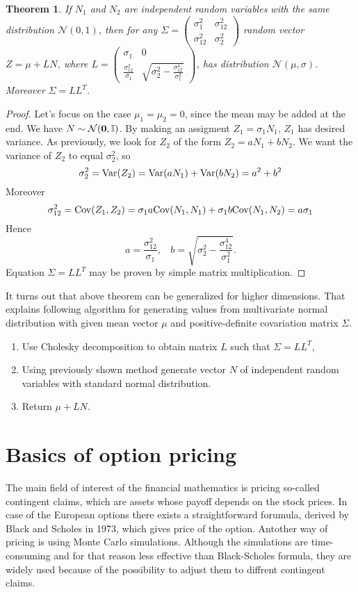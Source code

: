 \documentclass[a4paper,12pt, oneside]{book}
\newtheorem{thm}{Theorem}[chapter]
\theoremstyle{definition}
\theoremstyle{remark}
\def\Var{{\rm Var}}
\def\Cov{{\hbox{Cov}}}
\begin{document}
\begin{thm}
 If $N_1$ and $N_2$ are independent random variables with the same distribution $\mathcal{N}(0,1)$, then for any
 $\Sigma = \left( \begin{array}{cc}
                      \sigma_1^2 & \sigma_{12}^2 \\
                      \sigma_{12}^2 & \sigma_2^2
                   \end{array} \right)$
 random vector $ Z = \mu + LN$, where
  $L = \left( \begin{array}{cc}
                      \sigma_1 & 0 \\
                      \frac{\sigma_{12}^2}{\sigma_1} & \sqrt{\sigma_2^2 - \frac{\sigma_{12}^4}{\sigma_1^2}}
                   \end{array} \right)$,
 has distribution $\mathcal{N}(\mu,\sigma)$. Moreover $\Sigma = LL^T$.
\end{thm}
\begin{proof}
Let's focus on the case $\mu_1 = \mu_2 = 0$, since the mean may be added at the end. We have $N \sim \mathcal{N}(\bf{0}, \mathbb{I})$. By making an assigment $Z_1 = \sigma_1 N_1$, $Z_1$ has desired variance. As previously, we look for $Z_2$ of the form $Z_2 = a N_1 + b N_2$. We want the variance of $Z_2$ to equal $\sigma_2^2$, so
\[ \sigma_2^2 = \Var(Z_2) = \Var( a N_1) +  \Var(b N_2) = a^2 + b^2 \]
Moreover
\[ \sigma_{12}^2 = \Cov(Z_1, Z_2) = \sigma_1 a\Cov(N_1, N_1) + \sigma_1 b\Cov(N_1, N_2) = a\sigma_1 \]
Hence
\[ a = \frac{\sigma_{12}^2}{\sigma_1},\ \ \ \ b = \sqrt{\sigma_2^2 - \frac{\sigma_{12}^4}{\sigma_1^2}}. \] 
Equation $\Sigma = LL^T$ may be proven by simple matrix multiplication.
\end{proof}

It turns out that above theorem can be generalized for higher dimensions. That explains following algorithm for generating values from multivariate normal distribution with given mean vector $\mu$ and positive-definite covariation matrix $\Sigma$. 
\begin{enumerate}
 \item Use Cholesky decomposition to obtain matrix $L$ such that $\Sigma = LL^T$,
 \item Using previously shown method generate vector $N$ of independent random variables with standard normal distribution.
 \item Return $\mu + LN$.
\end{enumerate}


\chapter{Basics of option pricing}
The main field of interest of the financial mathematics is pricing so-called contingent claims, which are assets whose payoff depends on the stock prices. In case of the European options there exists a straightforward forumula, derived by Black and Scholes in 1973, which gives price of the option. Antother way of pricing is using Monte Carlo simulations.
Although the simulations are time-consuming and for that reason less effective than Black-Scholes formula, they are widely used because of the possibility to adjust them to diffrent contingent claims. 
\end{document}
